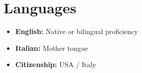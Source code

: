 \documentclass[10pt, letterpaper]{article}
\begin{document}
  \section{\texorpdfstring{\textbf{Languages}}{Languages}}
  \label{languages}

  \begin{itemize}
    \item \textbf{English:} Native or bilingual proficiency

    \item \textbf{Italian:} Mother tongue

    \item \textbf{Citizenship:} USA / Italy
  \end{itemize}
\end{document}
